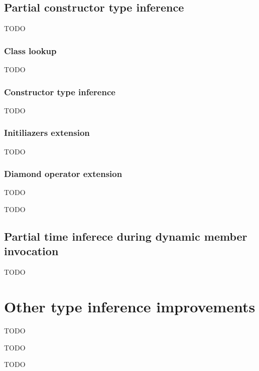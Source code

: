 \subsection{Partial constructor type inference}

TODO

\subsubsection*{Class lookup}

TODO

\subsubsection*{Constructor type inference}

TODO

\subsubsection*{Initiliazers extension}

TODO

\subsubsection*{Diamond operator extension}

TODO


TODO

\subsection{Partial time inferece during dynamic member invocation}

TODO

\section{Other type inference improvements}

TODO


TODO


TODO